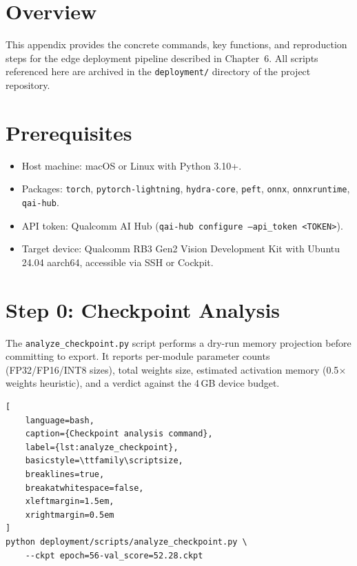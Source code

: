 \documentclass[../main.tex]{subfiles}
\begin{document}
\section{Overview}

\noindent This appendix provides the concrete commands, key functions, and reproduction steps for the edge deployment pipeline described in Chapter~6. All scripts referenced here are archived in the \texttt{deployment/} directory of the project repository.

\section{Prerequisites}

\begin{itemize}[itemsep=0.4em, topsep=0.4em]
    \item Host machine: macOS or Linux with Python 3.10+.
    \item Packages: \texttt{torch}, \texttt{pytorch-lightning}, \texttt{hydra-core}, \texttt{peft}, \texttt{onnx}, \texttt{onnxruntime}, \texttt{qai-hub}.
    \item API token: Qualcomm AI Hub (\texttt{qai-hub configure --api\_token <TOKEN>}).
    \item Target device: Qualcomm RB3 Gen2 Vision Development Kit with Ubuntu 24.04 aarch64, accessible via SSH or Cockpit.
\end{itemize}

\section{Step 0: Checkpoint Analysis}

\noindent The \texttt{analyze\_checkpoint.py} script performs a dry-run memory projection before committing to export. It reports per-module parameter counts (FP32/FP16/INT8 sizes), total weights size, estimated activation memory (0.5$\times$ weights heuristic), and a verdict against the 4\,GB device budget.

\begin{lstlisting}[
    language=bash,
    caption={Checkpoint analysis command},
    label={lst:analyze_checkpoint},
    basicstyle=\ttfamily\scriptsize,
    breaklines=true,
    breakatwhitespace=false,
    xleftmargin=1.5em,
    xrightmargin=0.5em
]
python deployment/scripts/analyze_checkpoint.py \
    --ckpt epoch=56-val_score=52.28.ckpt
\end{lstlisting}
\end{document}
